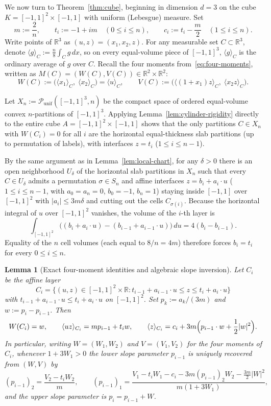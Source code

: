 \documentclass[11pt,a4paper]{amsart}
\numberwithin{equation}{section}
\newtheorem{lemma}[theorem]{Lemma}
\theoremstyle{definition}
\newcommand{\R}{\mathbb{R}}
\newcommand{\Pcal}{\mathcal{P}}
\newcommand{\avg}[2]{\langle #1 \rangle_{#2}}
\begin{document}
We now turn to Theorem~\ref{thm:cube}, beginning in dimension $d = 3$ on the cube $K = [-1,1]^2 \times [-1,1]$ with uniform (Lebesgue) measure. Set
\[
m := \frac{2}{n}, \qquad t_i := -1 + i m \quad (0 \le i \le n), \qquad c_i := t_i - \frac{m}{2} \quad (1 \le i \le n).
\]
Write points of $\R^3$ as $(u, z) = (x_1, x_2, z)$. For any measurable set $C \subset \R^3$, denote $\avg{g}{C} := \frac{n}{8} \int_C g\, dx$, so on every equal-volume piece of $[-1,1]^3$, $\avg{g}{C}$ is the ordinary average of $g$ over $C$. Recall the four moments from~\eqref{eq:four-moments}, written as $M(C) = (W(C), V(C)) \in \R^2 \times \R^2$:
\[
W(C) := \bigl(\avg{x_1}{C},\; \avg{x_2}{C}\bigr) = \avg{u}{C}, \qquad
V(C) := \bigl(\avg{(1+x_1)z}{C},\; \avg{x_2 z}{C}\bigr).
\]

Let $X_n := \Pcal_{\mathrm{unif}}([-1,1]^3, n)$ be the compact space of ordered equal-volume convex $n$-partitions of $[-1,1]^3$. Applying Lemma~\ref{lem:cylinder-rigidity} directly to the entire cube $A = [-1,1]^2 \times [-1,1]$ shows that the only partitions $C \in X_n$ with $W(C_i) = 0$ for all $i$ are the horizontal equal-thickness slab partitions (up to permutation of labels), with interfaces $z = t_i$ ($1 \le i \le n-1$).

By the same argument as in Lemma~\ref{lem:local-chart}, for any $\delta > 0$ there is an open neighborhood $U_\delta$ of the horizontal slab partitions in $X_n$ such that every $C \in U_\delta$ admits a permutation $\sigma \in S_n$ and affine interfaces $z = b_i + a_i \cdot u$ ($1 \le i \le n-1$, with $a_0 = a_n = 0$, $b_0 = -1$, $b_n = 1$) staying inside $[-1,1]$ over $[-1,1]^2$ with $|a_i| \le 3 m \delta$ and cutting out the cells $C_{\sigma(i)}$. Because the horizontal integral of $u$ over $[-1,1]^2$ vanishes, the volume of the $i$-th layer is
\[
\int_{[-1,1]^2} \bigl((b_i + a_i \cdot u) - (b_{i-1} + a_{i-1} \cdot u)\bigr)\, du = 4 (b_i - b_{i-1}).
\]
Equality of the $n$ cell volumes (each equal to $8/n = 4m$) therefore forces $b_i = t_i$ for every $0 \le i \le n$.

\begin{lemma}[Exact four-moment identities and algebraic slope inversion]
\label{lem:cube-moments}
Let $C_i$ be the affine layer
\[
C_i = \bigl\{(u, z) \in [-1,1]^2 \times \R : t_{i-1} + a_{i-1} \cdot u \le z \le t_i + a_i \cdot u\bigr\}
\]
with $t_{i-1} + a_{i-1} \cdot u \le t_i + a_i \cdot u$ on $[-1,1]^2$. Set $p_k := a_k / (3m)$ and $w := p_i - p_{i-1}$. Then
\begin{equation}
\label{eq:cube-moment-formulas}
W(C_i) = w, \qquad
\avg{u z}{C_i} = m p_{i-1} + t_i w, \qquad
\avg{z}{C_i} = c_i + 3m\Bigl(p_{i-1} \cdot w + \frac{1}{2} |w|^2\Bigr).
\end{equation}
In particular, writing $W = (W_1, W_2)$ and $V = (V_1, V_2)$ for the four moments of $C_i$, whenever $1 + 3 W_1 > 0$ the lower slope parameter $p_{i-1}$ is uniquely recovered from $(W, V)$ by
\begin{equation}
\label{eq:cube-inversion}
(p_{i-1})_2 = \frac{V_2 - t_i W_2}{m}, \qquad
(p_{i-1})_1 = \frac{V_1 - t_i W_1 - c_i - 3m (p_{i-1})_2 W_2 - \frac{3m}{2}|W|^2}{m(1 + 3 W_1)},
\end{equation}
and the upper slope parameter is $p_i = p_{i-1} + W$.
\end{lemma}
\end{document}
